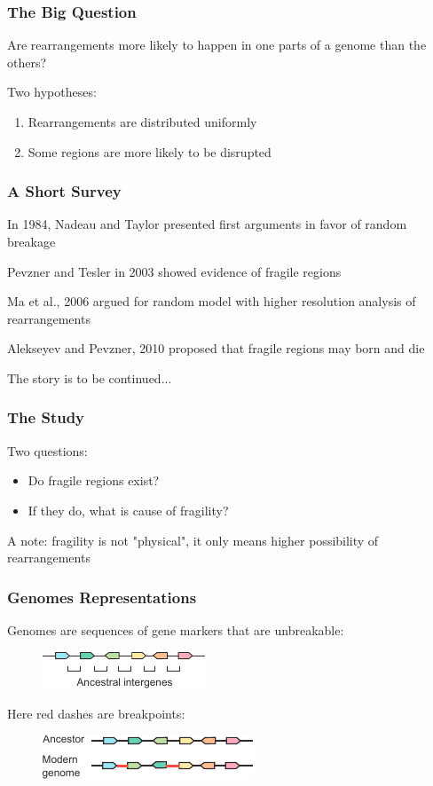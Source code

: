 \documentclass[svgnames,14pt]{beamer}
\begin{document}
\begin{frame}
\frametitle{The Big Question}
Are rearrangements more likely to happen in one parts of a genome than the others?
\pause

\vspace{12pt}
Two hypotheses:
\begin{enumerate}
\item Rearrangements are distributed uniformly
\item Some regions are more likely to be disrupted
\end{enumerate}
\end{frame}

\begin{frame}
\frametitle{A Short Survey}
In 1984, Nadeau and Taylor presented first arguments in favor of random breakage

\pause
\vspace{12pt}
Pevzner and Tesler in 2003 showed evidence of fragile regions

\pause
\vspace{12pt}
Ma et al., 2006 argued for random model with higher resolution analysis of rearrangements 

\pause
\vspace{12pt}
Alekseyev and Pevzner, 2010 proposed that fragile regions may born and die

\pause
\vspace{12pt}
The story is to be continued...
\end{frame}

\begin{frame}
\frametitle{The Study}
Two questions:
\begin{itemize}
\item Do fragile regions exist?
\item If they do, what is cause of fragility?
\end{itemize}

\vspace{12pt}
A note: fragility is not "physical", it only means higher possibility of rearrangements
\end{frame}

\begin{frame}
\frametitle{Genomes Representations}
Genomes are sequences of gene markers that are unbreakable:
\begin{figure}
	\centering
	\includegraphics[scale = 2.20]{Intergenes.pdf}
\end{figure}
\pause
\vspace{12pt}
Here red dashes are breakpoints:
\begin{figure}
	\centering
	\includegraphics[scale = 2.20]{Breakpoint.pdf}
\end{figure}
\end{frame}
\end{document}
